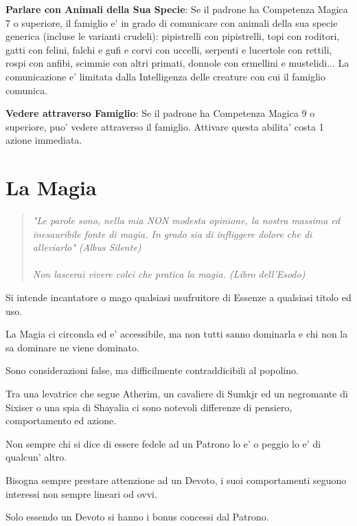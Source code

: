 \documentclass[a4paper,11pt,twoside,openany]{book}
\begin{document}
	\textbf{Parlare con Animali della Sua Specie}: Se il padrone ha Competenza Magica 7 o superiore, il famiglio e' in grado di comunicare con animali della sua specie generica (incluse le varianti crudeli): pipistrelli con pipistrelli, topi con roditori, gatti con felini, falchi e gufi e corvi con uccelli, serpenti e lucertole con rettili, rospi con anfibi, scimmie con altri primati, donnole con ermellini e mustelidi... La comunicazione e' limitata dalla Intelligenza delle creature con cui il famiglio comunica.
	
	\textbf{Vedere attraverso Famiglio}: Se il padrone ha Competenza Magica 9 o superiore, puo' vedere attraverso il famiglio. Attivare questa abilita' costa 1 azione immediata.
	
	\pagebreak
	
	\section{La Magia}
	
	\label{la-magia}
	\begin{quote}\textit{
			"Le parole sono, nella mia NON modesta opinione, la nostra massima ed inesauribile fonte di magia. In grado sia di infliggere dolore che di alleviarlo" (Albus Silente)\\\\
			Non lascerai vivere colei che pratica la magia. (Libro dell'Esodo)
	}\end{quote}
	
	Si intende incantatore o mago qualsiasi usufruitore di Essenze a qualsiasi titolo ed uso.
	
	La Magia ci circonda ed e' accessibile, ma non tutti sanno dominarla e chi non la sa dominare ne viene dominato.
	
	Sono considerazioni false, ma difficilmente contraddicibili al popolino.
	
	Tra una levatrice che segue Atherim, un cavaliere di Sumkjr ed un negromante di Sixiser o una spia di Shayalia ci sono notevoli differenze di pensiero, comportamento ed azione.
	
	Non sempre chi si dice di essere fedele ad un Patrono lo e' o peggio lo e' di qualcun' altro.
	
	Bisogna sempre prestare attenzione ad un Devoto, i suoi comportamenti seguono interessi non sempre lineari od ovvi.
	
	Solo essendo un Devoto si hanno i bonus concessi dal Patrono. 
	
\end{document}
